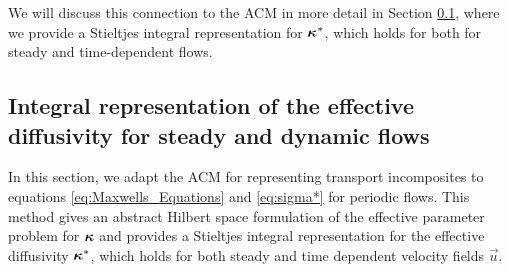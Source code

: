 \documentclass[11pt]{amsart}
\newcommand{\Hb}{\mathbf{H}}
\newcommand\bkappa{\mbox{\boldmath${\kappa}$}}
\begin{document}
%
We will discuss this connection to the ACM in more detail in Section
\ref{sec:Integral_Rep}, where we provide a Stieltjes integral
representation for $\bkappa^*$, which holds for both for steady and
time-dependent flows. 




\subsection{Integral representation of the effective diffusivity for
  steady and dynamic flows}\label{sec:Integral_Rep}
%
In this section, we adapt the ACM for representing transport
incomposites \cite{Golden:CMP-473} to equations
\eqref{eq:Maxwells_Equations} and \eqref{eq:sigma*} for periodic
flows. This method gives an abstract Hilbert space formulation of the
effective parameter problem for $\bkappa$ and provides a Stieltjes
integral representation for the effective diffusivity $\bkappa^*$,
which holds for both steady and time dependent velocity fields
$\vec{u}$.
\end{document}
